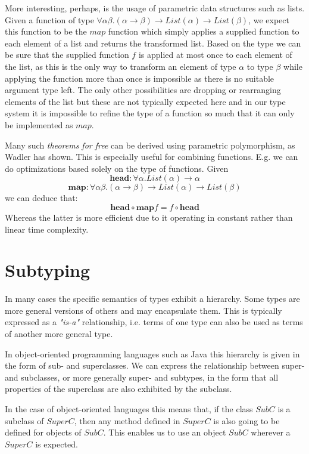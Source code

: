 More interesting,  perhaps, is the usage of parametric data structures such as lists.
Given a function of type $\forall \alpha \beta. (\alpha \to \beta) \to \mathit{List}(\alpha) \to \mathit{List}(\beta)$, we expect this function to be the $\mathit{map}$ function which simply applies a supplied function to each element of a list and returns the transformed list.
Based on the type we can be sure that the supplied function $f$ is applied at most once to each element of the list, as this is the only way to transform an element of type $\alpha$ to type $\beta$ while applying the function more than once is impossible as there is no suitable argument type left.
The only other possibilities are dropping or rearranging elements of the list but these are not typically expected here and in our type system it is impossible to refine the type of a function so much that it can only be implemented as $\mathit{map}$.

Many such \emph{theorems for free} can be derived using parametric polymorphism, as Wadler has shown. \cite{wadlertheorems}
This is especially useful for combining functions.
E.g. we can do optimizations based solely on the type of functions.
Given
$$\mathbf{head}  : \forall \alpha. \mathit{List}(\alpha) \to \alpha$$
$$\mathbf{map} : \forall \alpha \beta. (\alpha \to \beta) \to \mathit{List}(\alpha) \to \mathit{List}(\beta)$$
we can deduce that: $$\mathbf{head} \circ \mathbf{map} f = f \circ \mathbf{head}$$
Whereas the latter is more efficient due to it operating in constant rather than linear time complexity.

\section{Subtyping}\label{sec:subtyping}

In many cases the specific semantics of types exhibit a hierarchy.
Some types are more general versions of others and may encapsulate them.
This is typically expressed as a \emph{"is-a"} relationship, i.e. terms of one type can also be used as terms of another more general type.

In object-oriented programming languages such as Java this hierarchy is given in the form of sub- and superclasses.
We can express the relationship between super- and subclasses, or more generally super- and subtypes,
in the form that all properties of the superclass are also exhibited by the subclass. \cite{subtyping}

In the case of object-oriented languages this means that, if the class $\mathit{SubC}$ is a subclass of $\mathit{SuperC}$,
then any method defined in $\mathit{SuperC}$ is also going to be defined for objects of $\mathit{SubC}$.
This enables us to use an object $\mathit{SubC}$ wherever a $\mathit{SuperC}$ is expected.

